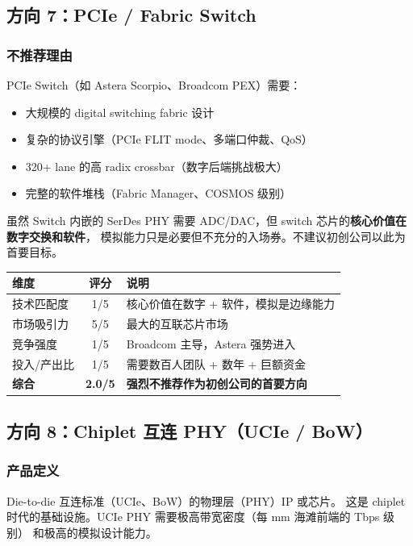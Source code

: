 \documentclass[11pt,a4paper]{ctexart}
\begin{document}
\subsection{方向 7：PCIe / Fabric Switch}

\subsubsection{不推荐理由}
PCIe Switch（如 Astera Scorpio、Broadcom PEX）需要：
\begin{itemize}
    \item 大规模的 digital switching fabric 设计
    \item 复杂的协议引擎（PCIe FLIT mode、多端口仲裁、QoS）
    \item 320+ lane 的高 radix crossbar（数字后端挑战极大）
    \item 完整的软件堆栈（Fabric Manager、COSMOS 级别）
\end{itemize}
虽然 Switch 内嵌的 SerDes PHY 需要 ADC/DAC，但 switch 芯片的\textbf{核心价值在数字交换和软件}，
模拟能力只是必要但不充分的入场券。不建议初创公司以此为首要目标。

\begin{table}[htb]
    \centering
    \begin{tabular}{l c p{}}
        \toprule
        \textbf{维度} & \textbf{评分} & \textbf{说明} \\
        \midrule
        技术匹配度 & 1/5 & 核心价值在数字 + 软件，模拟是边缘能力 \\
        市场吸引力 & 5/5 & 最大的互联芯片市场 \\
        竞争强度 & 1/5 & Broadcom 主导，Astera 强势进入 \\
        投入/产出比 & 1/5 & 需要数百人团队 + 数年 + 巨额资金 \\
        \midrule
        \rowcolor{red!8}
        \textbf{综合} & \textbf{2.0/5} & \textbf{强烈不推荐作为初创公司的首要方向} \\
        \bottomrule
    \end{tabular}
\end{table}

\subsection{方向 8：Chiplet 互连 PHY（UCIe / BoW）}

\subsubsection{产品定义}
Die-to-die 互连标准（UCIe、BoW）的物理层（PHY）IP 或芯片。
这是 chiplet 时代的基础设施。UCIe PHY 需要极高带宽密度（每 mm 海滩前端的 Tbps 级别）
和极高的模拟设计能力。
\end{document}
